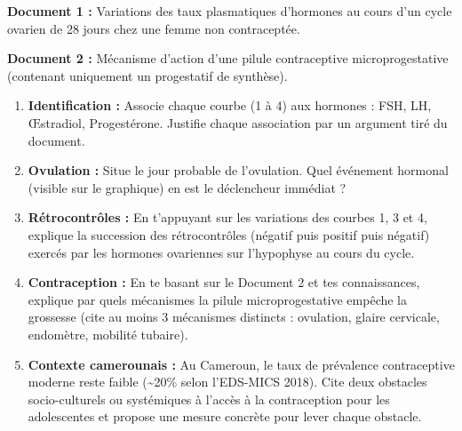 \documentclass[11pt]{article}
\newcounter{popsec}
\newcounter{popsub}
\newcommand{\courssub}[1]{%
  \stepcounter{popsub}%
  \par\vspace{9pt}\noindent{\popxbold\fontsize{11.5}{13}\selectfont\color{popink}{\color{poporange}\thepopsec.\thepopsub}\hspace{6pt}#1}\par\nopagebreak\vspace{4pt}
}
\begin{document}
\courssub{Je me prépare au Bac}

\begin{exercice}
\textbf{Document 1 :} Variations des taux plasmatiques d'hormones au cours d'un cycle ovarien de 28 jours chez une femme non contraceptée.
\begin{center}
\end{center}
\textbf{Document 2 :} Mécanisme d'action d'une pilule contraceptive \og microprogestative \fg (contenant uniquement un progestatif de synthèse).
\begin{enumerate}
    \item \textbf{Identification :} Associe chaque courbe (1 à 4) aux hormones : FSH, LH, Œstradiol, Progestérone. Justifie chaque association par un argument tiré du document.
    \item \textbf{Ovulation :} Situe le jour probable de l'ovulation. Quel événement hormonal (visible sur le graphique) en est le déclencheur immédiat ?
    \item \textbf{Rétrocontrôles :} En t'appuyant sur les variations des courbes 1, 3 et 4, explique la succession des rétrocontrôles (négatif puis positif puis négatif) exercés par les hormones ovariennes sur l'hypophyse au cours du cycle.
    \item \textbf{Contraception :} En te basant sur le Document 2 et tes connaissances, explique par quels mécanismes la pilule microprogestative empêche la grossesse (cite au moins 3 mécanismes distincts : ovulation, glaire cervicale, endomètre, mobilité tubaire).
    \item \textbf{Contexte camerounais :} Au Cameroun, le taux de prévalence contraceptive moderne reste faible (\textasciitilde 20\% selon l'EDS-MICS 2018). Cite deux obstacles socio-culturels ou systémiques à l'accès à la contraception pour les adolescentes et propose une mesure concrète pour lever chaque obstacle.
\end{enumerate}
\end{exercice}
\end{document}
